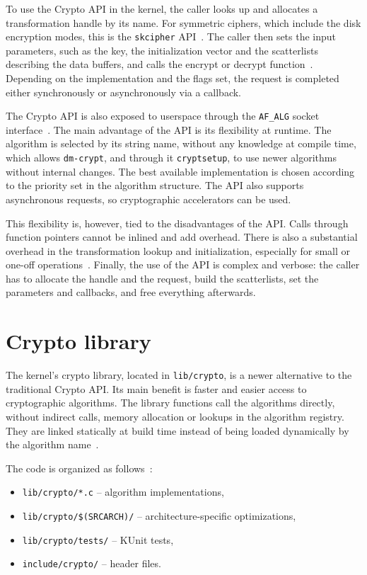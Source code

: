 \documentclass[
  digital,     %
  oneside,     %
  nosansbold,  %
  nocolorbold, %
  lof,         %
  lot,         %
]{fithesis4}
\begin{document}
To use the Crypto API in the kernel, the caller looks up and allocates a transformation handle by its name. For symmetric ciphers, which include the disk encryption modes, this is the \texttt{skcipher} API~\cite{noauthor_symmetric_nodate}. The caller then sets the input parameters, such as the key, the initialization vector and the scatterlists describing the data buffers, and calls the encrypt or decrypt function~\cite{noauthor_symmetric_nodate}. Depending on the implementation and the flags set, the request is completed either synchronously or asynchronously via a callback.

The Crypto API is also exposed to userspace through the \texttt{AF\_ALG} socket interface~\cite{noauthor_user_nodate}. The main advantage of the API is its flexibility at runtime. The algorithm is selected by its string name, without any knowledge at compile time, which allows \texttt{dm-crypt}, and through it \texttt{cryptsetup}, to use newer algorithms without internal changes. The best available implementation is chosen according to the priority set in the algorithm structure. The API also supports asynchronous requests, so cryptographic accelerators can be used.

This flexibility is, however, tied to the disadvantages of the API. Calls through function pointers cannot be inlined and add overhead. There is also a substantial overhead in the transformation lookup and initialization, especially for small or one-off operations~\cite{noauthor_crypto_nodate}. Finally, the use of the API is complex and verbose: the caller has to allocate the handle and the request, build the scatterlists, set the parameters and callbacks, and free everything afterwards.

\section{Crypto library}

The kernel's crypto library, located in \texttt{lib/crypto}, is a newer alternative to the traditional Crypto API. Its main benefit is faster and easier access to cryptographic algorithms. The library functions call the algorithms directly, without indirect calls, memory allocation or lookups in the algorithm registry. They are linked statically at build time instead of being loaded dynamically by the algorithm name~\cite{noauthor_crypto_nodate}.

The code is organized as follows~\cite{noauthor_crypto_nodate}:
\begin{itemize}
  \item \texttt{lib/crypto/*.c} -- algorithm implementations,
  \item \texttt{lib/crypto/\$(SRCARCH)/} -- architecture-specific optimizations,
  \item \texttt{lib/crypto/tests/} -- KUnit tests,
  \item \texttt{include/crypto/} -- header files.
\end{itemize}
\end{document}
